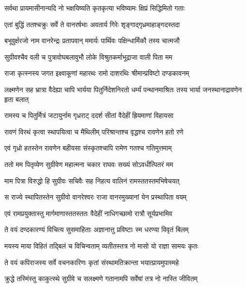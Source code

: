 \twolineshloka
{सर्वथा प्रायमासीनान्यदि नो भक्षयिष्यति}
{कृतकृत्या भविष्यामः क्षिप्रं सिद्धिमितो गताः} %

\twolineshloka
{एतां बुद्धिं ततश्चक्रुः सर्वे ते वानरर्षभाः}
{अवतार्य गिरेः शृङ्गाद्गृध्रमाहाङ्गदस्तदा} %

\twolineshloka
{बभूवुर्क्षरजो नाम वानरेन्द्रः प्रतापवान्}
{ममार्यः पार्थिवः पक्षिन्धार्मिकौ तस्य चात्मजौ} %

\twolineshloka
{सुग्रीवश्चैव वली च पुत्रावोघबलावुभौ}
{लोके विश्रुतकर्माभूद्राजा वाली पिता मम} %

\twolineshloka
{राजा कृत्स्नस्य जगत इक्ष्वाकूणां महारथः}
{रामो दाशरथिः श्रीमान्प्रविष्टो दण्डकावनम्} %

\threelineshloka
{लक्ष्मणेन सह भ्रात्रा वैदेह्या चापि भार्यया}
{पितुर्निदेशनिरतो धर्म्यं पन्थानमाश्रितः}
{तस्य भार्या जनस्थानाद्रावणेन हृता बलात्} %

\twolineshloka
{रामस्य च पितुर्मित्रं जटायुर्नाम गृध्रराट्}
{ददर्श सीतां वैदेहीं ह्रियमाणां विहायसा} %

\twolineshloka
{रावणं विरथं कृत्वा स्थापयित्वा च मैथिलीम्}
{परिश्रान्तश्च वृद्धश्च रावणेन हतो रणे} %

\twolineshloka
{एवं गृध्रो हतस्तेन रावणेन बहीयसा}
{संस्कृतश्चापि रामेण गतश्च गतिमुत्तमाम्} %

\twolineshloka
{ततो मम पितृव्येण सुग्रीवेण महात्मना}
{चकार राघवः सख्यं सोऽवधीत्पितरं मम} %

\twolineshloka
{माम पित्रा विरुद्धो हि सुग्रीवः सचिवैः सह}
{निहत्य वालिनं रामस्ततस्तमभिषेचयत्} %

\twolineshloka
{स राज्ये स्थापितस्तेन सुग्रीवो वानरेश्वरः}
{राजा वानरमुख्यानां येन प्रस्थापिता वयम्} %

\twolineshloka
{एवं रामप्रयुक्तास्तु मार्गमाणास्ततस्ततः}
{वैदेहीं नाधिगच्छामो रात्रौ सूर्यप्रभामिव} %

\twolineshloka
{ते वयं दण्दकारण्यं विचित्य सुसमाहिताः}
{अज्ञानात्तु प्रविष्टाः स्म धरण्या विवृतं बिलम्} %

\twolineshloka
{मयस्य माया विहितं तद्बिलं च विचिन्वताम्}
{व्यतीतस्तत्र नो मासो यो राज्ञा सामयः कृतः} %

\twolineshloka
{ते वयं कपिराजस्य सर्वे वचनकारिणः}
{कृतां संस्थामतिक्रान्ता भयात्प्रायमुपास्महे} %

\twolineshloka
{क्रुद्धे तस्मिंस्तु काकुत्स्थे सुग्रीवे च सलक्ष्मणे}
{गतानामपि सर्वेषां तत्र नो नास्ति जीवितम्} %


